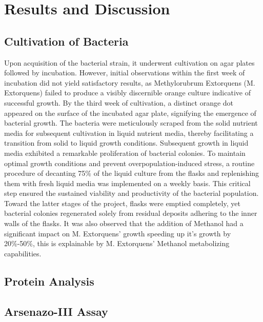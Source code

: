 \chapter{Results and Discussion}

\section{Cultivation of Bacteria\authorB}
Upon acquisition of the bacterial strain, it underwent cultivation on agar plates followed by
incubation. However, initial observations within the first week of incubation did not yield
satisfactory results, as Methylorubrum Extorquens (M. Extorquens) failed to produce a visibly
discernible orange culture indicative of successful growth.
By the third week of cultivation, a distinct orange dot appeared on the surface of the incubated
agar plate, signifying the emergence of bacterial growth. The bacteria were meticulously scraped
from the solid nutrient media for subsequent cultivation in liquid nutrient media, thereby
facilitating a transition from solid to liquid growth conditions.
Subsequent growth in liquid media exhibited a remarkable proliferation of bacterial colonies. To
maintain optimal growth conditions and prevent overpopulation-induced stress, a routine
procedure of decanting 75\% of the liquid culture from the flasks and replenishing them with fresh
liquid media was implemented on a weekly basis. This critical step ensured the sustained viability
and productivity of the bacterial population.
Toward the latter stages of the project, flasks were emptied completely, yet bacterial colonies
regenerated solely from residual deposits adhering to the inner walls of the flasks.
It was also observed that the addition of Methanol had a significant impact on M. Extorquens’
growth speeding up it’s growth by 20\%-50\%, this is explainable by M. Extorquens’ Methanol
metabolizing capabilities.

\section{Protein Analysis\authorA}

\section{Arsenazo-III Assay\authorA}

